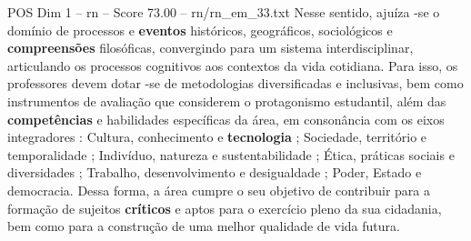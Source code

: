 \begin{textsample}{POS Dim 1 – rn – Score 73.00 – rn/rn\_em\_33.txt}
Nesse sentido, ajuíza -se o domínio de processos e \textbf{eventos} históricos, geográficos, sociológicos e \textbf{compreensões} filosóficas, convergindo para um sistema interdisciplinar, articulando os processos cognitivos aos contextos da vida cotidiana.
Para isso, os professores devem dotar -se de metodologias diversificadas e inclusivas, bem como instrumentos de avaliação que considerem o protagonismo estudantil, além das \textbf{competências} e habilidades específicas da área, em consonância com os eixos integradores : Cultura, conhecimento e \textbf{tecnologia} ; Sociedade, território e temporalidade ; Indivíduo, natureza e sustentabilidade ; Ética, práticas sociais e diversidades ; Trabalho, desenvolvimento e desigualdade ; Poder, Estado e democracia.
Dessa forma, a área cumpre o seu objetivo de contribuir para a formação de sujeitos \textbf{críticos} e aptos para o exercício pleno da sua cidadania, bem como para a construção de uma melhor qualidade de vida futura.

\end{textsample}
